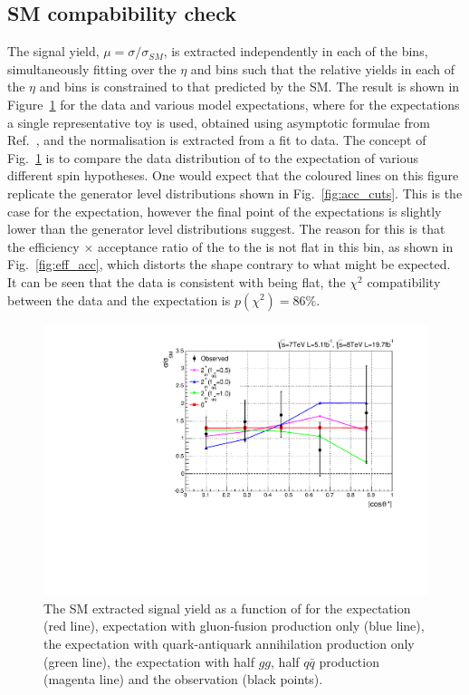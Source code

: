 \subsection{SM compabibility check}
The signal yield, $\mu=\sigma/\sigma_{SM}$, is extracted independently in each of the \abscostheta bins, 
simultaneously fitting over the $\eta$ and \rnine bins such that the relative yields in each of the $\eta$ and \rnine 
bins is constrained to that predicted by the SM. The result is shown in Figure~\ref{fig:channelcomp} for the data and various \twomp model expectations, where for the expectations a single representative toy is used, obtained using asymptotic formulae from Ref.~\cite{asymptotic_form}, and the normalisation is extracted from a fit to data. The concept of Fig.~\ref{fig:channelcomp} is to compare the data distribution of \abscostheta to the expectation of various different spin hypotheses. One would expect that the coloured lines on this figure replicate the generator level distributions shown in Fig.~\ref{fig:acc_cuts}. This is the case for the \SM \zerop expectation, however the final point of the \twomp expectations is slightly lower than the generator level distributions suggest. The reason for this is that the efficiency $\times$ acceptance ratio of the \zerop to the \twomp is not flat in this bin, as shown in Fig.~\ref{fig:eff_acc}, which distorts the shape contrary to what might be expected. It can be seen that the data is consistent with being flat, the $\chi^{2}$ compatibility between the data and the \SM expectation is $p(\chi^{2})=86\%$.

\begin{figure}
  \begin{center}
    \includegraphics[width=0.8\linewidth]{results/plots/chcomp.pdf}
    \caption[The \acs{SM} signal strength extraction in bins of \abscostheta for the spin analyis]{The SM extracted signal yield as a function of \abscostheta for the \zerop expectation (red line), \twomp expectation with gluon-fusion production only (blue line), the \twomp expectation with quark-antiquark annihilation production only (green line), the \twomp expectation with half $gg$, half $q\bar{q}$ production (magenta line) and the observation (black points).}
    \label{fig:channelcomp}
  \end{center}
\end{figure}

